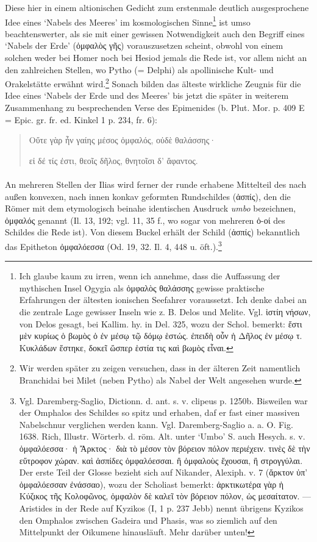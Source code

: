 \documentclass[a4paper, 11pt, oneside]{article}
\begin{document}
Diese hier in einem altionischen Gedicht zum erstenmale deutlich ausgesprochene Idee eines `Nabels des Meeres' im kosmologischen Sinne\footnote{Ich glaube kaum zu irren, wenn ich annehme, dass die Auffassung der mythischen Insel Ogygia als ὀμφαλὸς θαλάσσης gewisse praktische Erfahrungen der ältesten ionischen Seefahrer voraussetzt. Ich denke dabei an die zentrale Lage gewisser Inseln wie z. B. Delos und Melite. Vgl. ἱστίη νήσων, von Delos gesagt, bei Kallim. hy. in Del. 325, wozu der Schol. bemerkt: ἔστι μὲν κυρίως ὁ βωμὸς ὁ ἐν μέσῳ τῷ δόμῳ ἑστώς. ἐπειδὴ οὖν ἡ Δῆλος ἐν μέσῳ τ. Κυκλάδων ἕστηκε, δοκεῖ ὥσπερ ἑστία τις καὶ βωμὸς εἶναι.} ist umso beachtenswerter, als sie mit einer gewissen Notwendigkeit auch den Begriff eines `Nabels der Erde' (ὀμφαλὸς γῆς) vorauszusetzen scheint, obwohl von einem solchen weder bei Homer noch bei Hesiod jemals die Rede ist, vor allem nicht an den zahlreichen Stellen, wo Pytho (= Delphi) als apollinische Kult- und Orakelstätte erwähnt wird.\footnote{Wir werden später zu zeigen versuchen, dass in der älteren Zeit namentlich Branchidai bei Milet (neben Pytho) als Nabel der Welt angesehen wurde.} Sonach bilden das älteste wirkliche Zeugnis für die Idee eines `Nabels der Erde und des Meeres' bis jetzt die später in weiterem Zusammenhang zu besprechenden Verse des Epimenides (b. Plut. Mor. p. 409 E = Epic. gr. fr. ed. Kinkel 1 p. 234, fr. 6):
\begin{quotation}
Οὔτε γὰρ ἦν γαίης μέσος ὀμφαλός, οὐδὲ θαλάσσης·

εἰ δέ τίς ἐστι, θεοῖς δῆλος, θνητοῖσι δ' ἄφαντος.
\end{quotation}
\paragraph{}
An mehreren Stellen der Ilias wird ferner der runde erhabene Mittelteil des nach außen konvexen, nach innen konkav geformten Rundschildes (ἀσπίς), den die Römer mit dem etymologisch beinahe identischen Ausdruck \emph{umbo} bezeichnen, ὀμφαλός genannt (Il. 13, 192; vgl. 11, 35 f., wo sogar von mehreren ὀ-οί des Schildes die Rede ist). Von diesem Buckel erhält der Schild (ἀσπίς) bekanntlich das Epitheton ὀμφαλόεσσα (Od. 19, 32. Il. 4, 448 u. öft.).\footnote{Vgl. Daremberg-Saglio, Dictionn. d. ant. s. v. clipeus p. 1250b. Bisweilen war der Omphalos des Schildes so spitz und erhaben, daf er fast einer massiven Nabelschnur verglichen werden kann. Vgl. Daremberg-Saglio a. a. O. Fig. 1638. Rich, Illustr. Wörterb. d. röm. Alt. unter `Umbo' S. auch Hesych. s. v. ὀμφαλόεσσα· ἡ Ἄρκτος· διὰ τὸ μέσον τὸν βόρειον πόλον περιέχειν. τινὲς δὲ τὴν εὔτροφον χώραν. καὶ ἀσπίδες ὀμφαλόεσσαι. ἢ ὀμφαλοὺς ἔχουσαι, ἢ στρογγύλαι. Der erste Teil der Glosse bezieht sich auf Nikander, Alexiph. v. 7 (ἄρκτον ὑπ' ὀμφαλόεσσαν ἐνάσσαο), wozu der Scholiast bemerkt: ἀρκτικωτέρα γὰρ ἡ Κύζικος τῆς Κολοφῶνος, ὀμφαλὸν δὲ καλεῖ τὸν βόρειον πόλον, ὡς μεσαίτατον. --- Aristides in der Rede auf Kyzikos (I, 1 p. 237 Jebb) nennt übrigens Kyzikos den Omphalos zwischen Gadeira und Phasis, was so ziemlich auf den Mittelpunkt der Oikumene hinausläuft. Mehr darüber unten!}
\end{document}
